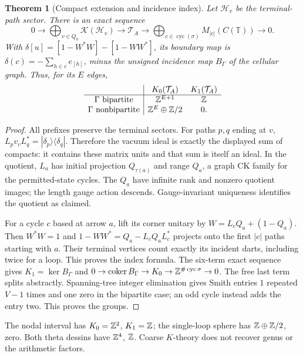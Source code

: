\documentclass[11pt]{article}
\newtheorem{theorem}{Theorem}[section]
\theoremstyle{definition}\newtheorem{definition}[theorem]{Definition}
\theoremstyle{remark}\newtheorem{remark}[theorem]{Remark}
\begin{document}
\begin{theorem}[Compact extension and incidence index]\label{thm:fock}
Let $\mathcal H_v$ be the terminal-path sector. There is an exact sequence
\[
 0\longrightarrow\bigoplus_{v\in Q_0}\mathcal K(\mathcal H_v)
 \longrightarrow\mathcal T_A\longrightarrow
 \bigoplus_{c\in\operatorname{cyc}(\sigma)}M_{|c|}(C(\mathbb T))\longrightarrow0.
\]
With $\delta[u]=[1-W^*W]-[1-WW^*]$, its boundary map is
$\delta(c)=-\sum_{h\in c}e_{[h]}$, minus the unsigned incidence map $B_\Gamma$ of the cellular graph. Thus, for its $E$ edges,
\[
\begin{array}{c|cc}
 &K_0(\mathcal T_A)&K_1(\mathcal T_A)\\\hline
\Gamma\text{ bipartite}&\mathbb Z^{E+1}&\mathbb Z\\
\Gamma\text{ nonbipartite}&\mathbb Z^E\oplus\mathbb Z/2&0.
\end{array}
\]
\end{theorem}
\begin{proof}
All prefixes preserve the terminal sectors. For paths $p,q$ ending at $v$, $L_pv_vL_q^*=|\delta_p\rangle\langle\delta_q|$. Therefore the vacuum ideal is exactly the displayed sum of compacts: it contains these matrix units and that sum is itself an ideal. In the quotient, $L_a$ has initial projection $Q_{\tau(a)}$ and range $Q_a$, a graph CK family for the permitted-state cycles. The $Q_a$ have infinite rank and nonzero quotient images; the length gauge action descends. Gauge-invariant uniqueness \cite[Theorem2.1]{BPRS} identifies the quotient as claimed.

For a cycle $c$ based at arrow $a$, lift its corner unitary by $W=L_cQ_a+(1-Q_a)$. Then $W^*W=1$ and $1-WW^*=Q_a-L_cQ_aL_c^*$ projects onto the first $|c|$ paths starting with $a$. Their terminal vertices count exactly its incident darts, including twice for a loop. This proves the index formula. The six-term exact sequence gives $K_1=\ker B_\Gamma$ and $0\to\operatorname{coker}B_\Gamma\to K_0\to\mathbb Z^{\#\operatorname{cyc}\sigma}\to0$. The free last term splits abstractly. Spanning-tree integer elimination gives Smith entries $1$ repeated $V-1$ times and one zero in the bipartite case; an odd cycle instead adds the entry two. This proves the groups.
\end{proof}
The nodal interval has $K_0=\mathbb Z^2$, $K_1=\mathbb Z$; the single-loop sphere has $\mathbb Z\oplus\mathbb Z/2$, zero. Both theta dessins have $\mathbb Z^4$, $\mathbb Z$. Coarse $K$-theory does not recover genus or the arithmetic factors.
\end{document}
